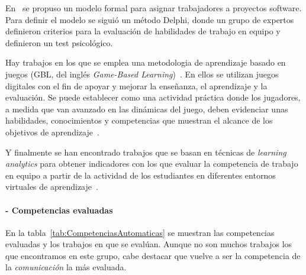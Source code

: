 En~\cite{andre2011formal} se propuso un modelo formal para asignar trabajadores a proyectos software. Para definir el modelo se siguió un método Delphi, donde un grupo de expertos definieron criterios para la evaluación de habilidades de trabajo en equipo y definieron un test psicológico.

Hay trabajos en los que se emplea una metodologia de aprendizaje basado en juegos (GBL, del inglés \emph{Game-Based Learning})~\cite{bedek2011behavioral,guenaga2013serious}. En ellos se utilizan juegos digitales con el fin de apoyar y mejorar la enseñanza, el aprendizaje y la evaluación. Se puede establecer como una actividad práctica donde los jugadores, a medida que van avanzado en las dinámicas del juego, deben evidenciar unas habilidades, conocimientos y competencias que muestran el alcance de los objetivos de aprendizaje~\cite{charlier2012not}. 

Y finalmente se han encontrado trabajos que se basan en técnicas de \emph{learning analytics} para obtener indicadores con los que evaluar la competencia de trabajo en equipo a partir de la actividad de los estudiantes en diferentes entornos virtuales de aprendizaje~\cite{fidalgo:2015,rayon2014web}.


\paragraph*{- Competencias evaluadas}
 En la tabla~\ref{tab:CompetenciasAutomaticas} se muestran las competencias evaluadas y los trabajos en que se evalúan. Aunque no son muchos trabajos los que encontramos en este grupo, cabe destacar que vuelve a ser la competencia de la \emph{comunicación} la más evaluada.

